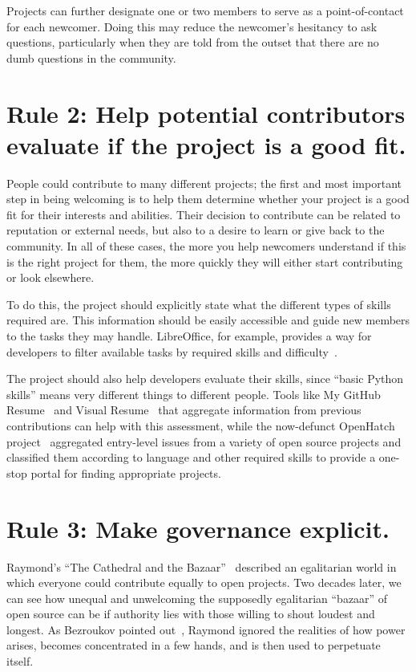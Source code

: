\documentclass[10pt,letterpaper]{article}
\newcommand{\rulemajor}[1]{\section*{#1}}
\begin{document}
Projects can further designate one or two members to serve as a point-of-contact for each newcomer.
Doing this may reduce the newcomer's hesitancy to ask questions,
particularly when they are told from the outset that there are no dumb questions in the community.

\rulemajor{Rule 2: Help potential contributors evaluate if the project is a good fit.}

People could contribute to many different projects;
the first and most important step in being welcoming is to help them determine whether
your project is a good fit for their interests and abilities.
Their decision to contribute can be related to reputation or external needs,
but also to a desire to learn or give back to the community.
In all of these cases,
the more you help newcomers understand if this is the right project for them,
the more quickly they will either start contributing or look elsewhere.

To do this,
the project should explicitly state what the different types of skills required are.
This information should be easily accessible and guide new members to the tasks they may handle.
LibreOffice,
for example,
provides a way for developers to filter available tasks by required skills and difficulty~\cite{libreoffice-filtered}.

The project should also help developers evaluate their skills,
since ``basic Python skills'' means very different things to different people.
Tools like My GitHub Resume~\cite{my-github-resume} and Visual Resume~\cite{sarma2016}
that aggregate information from previous contributions can help with this assessment,
while the now-defunct OpenHatch project~\cite{openhatch}
aggregated entry-level issues from a variety of open source projects
and classified them according to language and other required skills
to provide a one-stop portal for finding appropriate projects.

\rulemajor{Rule 3: Make governance explicit.}

Raymond's ``The Cathedral and the Bazaar''~\cite{raymond2001}
described an egalitarian world in which everyone could contribute equally to open projects.
Two decades later,
we can see how unequal and unwelcoming the supposedly egalitarian ``bazaar'' of open source can be
if authority lies with those willing to shout loudest and longest.
As Bezroukov pointed out~\cite{bezroukov1999},
Raymond ignored the realities of how power arises,
becomes concentrated in a few hands,
and is then used to perpetuate itself.
\end{document}
